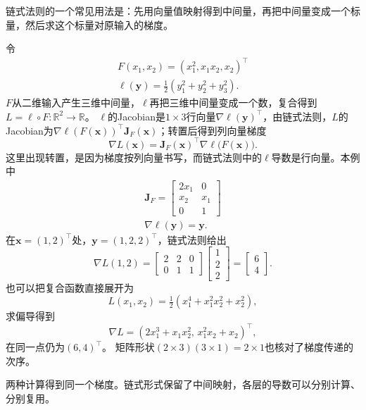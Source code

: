 链式法则的一个常见用法是：先用向量值映射得到中间量，再把中间量变成一个标量，然后求这个标量对原输入的梯度。
\begin{example}[从中间向量求回复合目标的梯度]
\label{ex:analysis-chain-rule-calculation}
令
\[
 \begin{gathered}
F(x_1,x_2)=(x_1^2,x_1x_2,x_2)^\top\\
\ell(\bm y)=\frac12(y_1^2+y_2^2+y_3^2).
 \end{gathered}
\]
$F$从二维输入产生三维中间量，$\ell$再把三维中间量变成一个数，复合得到$L=\ell\circ F:\mathbb R^2\to\mathbb R$。
$\ell$的Jacobian是$1\times3$行向量$\nabla\ell(\bm y)^\top$，由链式法则，$L$的Jacobian为$\nabla\ell(F(\bm x))^\top\bm J_F(\bm x)$；转置后得到列向量梯度
\[
  \nabla L(\bm x)=\bm J_F(\bm x)^\top\nabla\ell\bigl(F(\bm x)\bigr).
\]
这里出现转置，是因为梯度按列向量书写，而链式法则中的$\ell$导数是行向量。本例中
\[
\begin{gathered}
\bm J_F=\begin{bmatrix}2x_1&0\\x_2&x_1\\0&1\end{bmatrix}\\
\nabla\ell(\bm y)=\bm y.
\end{gathered}
\]
在$\bm x=(1,2)^\top$处，$\bm y=(1,2,2)^\top$，链式法则给出
\[
  \nabla L(1,2)
  =\begin{bmatrix}2&2&0\\0&1&1\end{bmatrix}
    \begin{bmatrix}1\\2\\2\end{bmatrix}
  =\begin{bmatrix}6\\4\end{bmatrix}.
\]
也可以把复合函数直接展开为
\[
 L(x_1,x_2)=\tfrac12(x_1^4+x_1^2x_2^2+x_2^2),
\]
求偏导得到
\[
 \nabla L=(2x_1^3+x_1x_2^2,\,x_1^2x_2+x_2)^\top,
\]
在同一点仍为$(6,4)^\top$。
矩阵形状$(2\times3)(3\times1)=2\times1$也核对了梯度传递的次序。
\end{example}

两种计算得到同一个梯度。链式形式保留了中间映射，各层的导数可以分别计算、分别复用。

